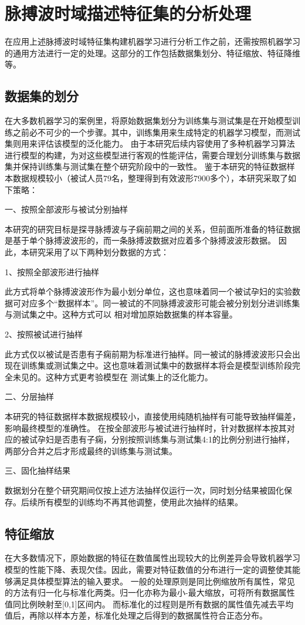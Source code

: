 \section{脉搏波时域描述特征集的分析处理}
在应用上述脉搏波时域特征集构建机器学习进行分析工作之前，还需按照机器学习的通用方法进行一定的处理。这部分的工作包括数据集划分、特征缩放、特征降维等。
\subsection{数据集的划分}
在大多数机器学习的案例里，将原始数据集划分为训练集与测试集是在开始模型训练之前必不可少的一个步骤。其中，训练集用来生成特定的机器学习模型，而测试集则用来评估该模型的泛化能力。
由于本研究后续内容使用了多种机器学习算法进行模型的构建，为对这些模型进行客观的性能评估，需要合理划分训练集与数据集并保持训练集与测试集在整个研究阶段中的一致性。
鉴于本研究的特征数据样本数据规模较小（被试人员79名，整理得到有效波形7900多个），本研究采取了如下策略：

一、按照全部波形与被试分别抽样

本研究的研究目标是探寻脉搏波与子痫前期之间的关系，但前面所准备的特征数据是基于单个脉搏波波形的，而一条脉搏波数据对应着多个脉搏波波形数据。
因此，本研究采用了以下两种划分数据的方式：

1、按照全部波形进行抽样

此方式将单个脉搏波波形作为最小划分单位，这也意味着同一个被试孕妇的实验数据可对应多个“数据样本”。同一被试的不同脉搏波波形可能会被分别划分进训练集与测试集之中。这种方式可以
相对增加原始数据集的样本容量。

2、按照被试进行抽样

此方式仅以被试是否患有子痫前期为标准进行抽样。同一被试的脉搏波波形只会出现在训练集或测试集之中。这也意味着测试集中的数据样本将会是模型训练阶段完全未见的。这种方式更考验模型在
测试集上的泛化能力。

二、分层抽样

本研究的特征数据样本数据规模较小，直接使用纯随机抽样有可能导致抽样偏差，影响最终模型的准确性\cite{Aurélien2018}。
在按全部波形与被试进行抽样时，针对数据样本按其对应的被试孕妇是否患有子痫，分别按照训练集与测试集4:1的比例分别进行抽样，两部分合并之后才形成最终的训练集与测试集。

三、固化抽样结果

数据划分在整个研究期间仅按上述方法抽样仅运行一次，同时划分结果被固化保存。后续所有模型的训练均不再其他调整，使用此次抽样的结果。

\subsection{特征缩放}
  在大多数情况下，原始数据的特征在数值属性出现较大的比例差异会导致机器学习模型的性能下降、表现欠佳\cite{Aurélien2018}。因此，需要对特征数值的分布进行一定的调整使其能够满足具体模型算法的输入要求。
  一般的处理原则是同比例缩放所有属性，常见的方法有归一化与标准化两类。归一化亦称为最小-最大缩放，可将所有数据属性值同比例映射至[0,1]区间内。
  而标准化的过程则是所有数据的属性值先减去平均值后，再除以样本方差，标准化处理之后得到的数据属性符合正态分布。

